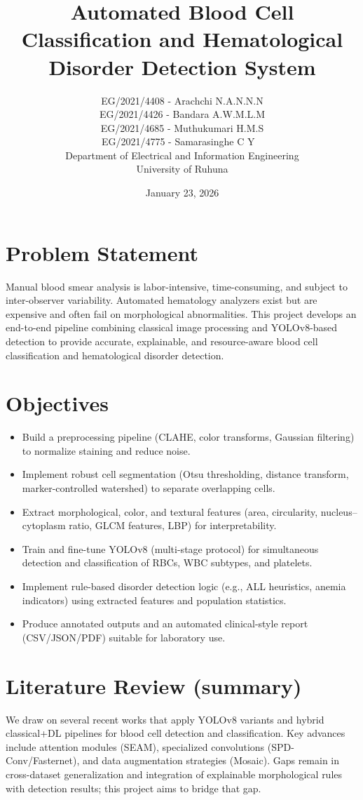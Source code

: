 \documentclass[11pt,a4paper]{article}
\title{Automated Blood Cell Classification and Hematological Disorder Detection System}
\author{EG/2021/4408 - Arachchi N.A.N.N.N \\ EG/2021/4426 - Bandara A.W.M.L.M \\ EG/2021/4685 - Muthukumari H.M.S \\ EG/2021/4775 - Samarasinghe C Y \
\\ Department of Electrical and Information Engineering \\ University of Ruhuna}
\date{January 23, 2026}
\begin{document}
\maketitle
\thispagestyle{empty}
\clearpage
\tableofcontents
\clearpage

\section{Problem Statement}
Manual blood smear analysis is labor-intensive, time-consuming, and subject to inter-observer variability. Automated hematology analyzers exist but are expensive and often fail on morphological abnormalities. This project develops an end-to-end pipeline combining classical image processing and YOLOv8-based detection to provide accurate, explainable, and resource-aware blood cell classification and hematological disorder detection.

\section{Objectives}
\begin{itemize}
  \item Build a preprocessing pipeline (CLAHE, color transforms, Gaussian filtering) to normalize staining and reduce noise.
  \item Implement robust cell segmentation (Otsu thresholding, distance transform, marker-controlled watershed) to separate overlapping cells.
  \item Extract morphological, color, and textural features (area, circularity, nucleus--cytoplasm ratio, GLCM features, LBP) for interpretability.
  \item Train and fine-tune YOLOv8 (multi-stage protocol) for simultaneous detection and classification of RBCs, WBC subtypes, and platelets.
  \item Implement rule-based disorder detection logic (e.g., ALL heuristics, anemia indicators) using extracted features and population statistics.
  \item Produce annotated outputs and an automated clinical-style report (CSV/JSON/PDF) suitable for laboratory use.
\end{itemize}

\section{Literature Review (summary)}
We draw on several recent works that apply YOLOv8 variants and hybrid classical+DL pipelines for blood cell detection and classification. Key advances include attention modules (SEAM), specialized convolutions (SPD-Conv/Fasternet), and data augmentation strategies (Mosaic). Gaps remain in cross-dataset generalization and integration of explainable morphological rules with detection results; this project aims to bridge that gap.
\end{document}

